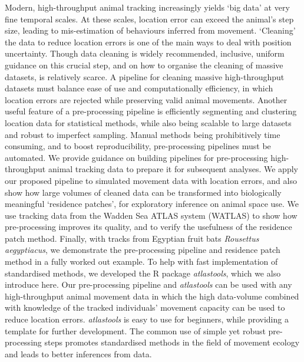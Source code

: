 \small{
    Modern, high-throughput animal tracking increasingly yields `big data' at very fine temporal scales. 
    At these scales, location error can exceed the animal's step size, leading to mis-estimation of behaviours inferred from movement. 
    `Cleaning' the data to reduce location errors is one of the main ways to deal with position uncertainty. 
    Though data cleaning is widely recommended, inclusive, uniform guidance on this crucial step, and on how to organise the cleaning of massive datasets, is relatively scarce.
    A pipeline for cleaning massive high-throughput datasets must balance ease of use and computationally efficiency, in which location errors are rejected while preserving valid animal movements. 
    Another useful feature of a pre-processing pipeline is efficiently segmenting and clustering location data for statistical methods, while also being scalable to large datasets and robust to imperfect sampling. 
    Manual methods being prohibitively time consuming, and to boost reproducibility, pre-processing pipelines must be automated.
    We provide guidance on building pipelines for pre-processing high-throughput animal tracking data to prepare it for subsequent analyses. 
    We apply our proposed pipeline to simulated movement data with location errors, and also show how large volumes of cleaned data can be transformed into biologically meaningful `residence patches', for exploratory inference on animal space use. 
    We use tracking data from the Wadden Sea ATLAS system (WATLAS) to show how pre-processing improves its quality, and to verify the usefulness of the residence patch method. 
    Finally, with tracks from Egyptian fruit bats \textit{Rousettus aegyptiacus}, we demonstrate the pre-processing pipeline and residence patch method in a fully worked out example.
    To help with fast implementation of standardised methods, we developed the R package \textit{atlastools}, which we also introduce here. 
    Our pre-processing pipeline and \textit{atlastools} can be used with any high-throughput animal movement data in which the high data-volume combined with knowledge of the tracked individuals’ movement capacity can be used to reduce location errors. 
    \textit{atlastools} is easy to use for beginners, while providing a template for further development. 
    The common use of simple yet robust pre-processing steps promotes standardised methods in the field of movement ecology and leads to better inferences from data.

}

\clearpage

